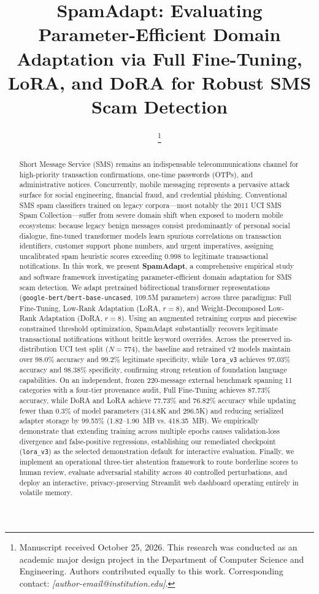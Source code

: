 \documentclass[conference]{IEEEtran}
\title{SpamAdapt: Evaluating Parameter-Efficient Domain Adaptation via Full Fine-Tuning, LoRA, and DoRA for Robust SMS Scam Detection}
\author{
    \IEEEauthorblockN{Akash Uchachariya\IEEEauthorrefmark{1}, Umang Mori\IEEEauthorrefmark{1}, and Keval Bamarotiya\IEEEauthorrefmark{1}}
    \IEEEauthorblockA{\IEEEauthorrefmark{1}\textit{Department of Computer Science and Engineering} \\
    \textit{[Institution / University Name]} \quad \textit{[City, State, Country]} \\
    \textit{Emails: [akash.uchachariya@institution.edu, umang.mori@institution.edu, keval.bamarotiya@institution.edu]}}
    \thanks{Manuscript received October 25, 2026. This research was conducted as an academic major design project in the Department of Computer Science and Engineering. Authors contributed equally to this work. Corresponding contact: \textit{[author-email@institution.edu]}.}
}
\begin{document}
\maketitle

\begin{abstract}
Short Message Service (SMS) remains an indispensable telecommunications channel for high-priority transaction confirmations, one-time passwords (OTPs), and administrative notices. Concurrently, mobile messaging represents a pervasive attack surface for social engineering, financial fraud, and credential phishing. Conventional SMS spam classifiers trained on legacy corpora---most notably the 2011 UCI SMS Spam Collection---suffer from severe domain shift when exposed to modern mobile ecosystems: because legacy benign messages consist predominantly of personal social dialogue, fine-tuned transformer models learn spurious correlations on transaction identifiers, customer support phone numbers, and urgent imperatives, assigning uncalibrated spam heuristic scores exceeding 0.998 to legitimate transactional notifications. In this work, we present \textbf{SpamAdapt}, a comprehensive empirical study and software framework investigating parameter-efficient domain adaptation for SMS scam detection. We adapt pretrained bidirectional transformer representations (\texttt{google-bert/bert-base-uncased}, 109.5M parameters) across three paradigms: Full Fine-Tuning, Low-Rank Adaptation (LoRA, $r=8$), and Weight-Decomposed Low-Rank Adaptation (DoRA, $r=8$). Using an augmented retraining corpus and piecewise constrained threshold optimization, SpamAdapt substantially recovers legitimate transactional notifications without brittle keyword overrides. Across the preserved in-distribution UCI test split ($N=774$), the baseline and retrained v2 models maintain over 98.0\% accuracy and 99.2\% legitimate specificity, while \texttt{lora\_v3} achieves 97.03\% accuracy and 98.38\% specificity, confirming strong retention of foundation language capabilities. On an independent, frozen 220-message external benchmark spanning 11 categories with a four-tier provenance audit, Full Fine-Tuning achieves 87.73\% accuracy, while DoRA and LoRA achieve 77.73\% and 76.82\% accuracy while updating fewer than 0.3\% of model parameters (314.8K and 296.5K) and reducing serialized adapter storage by 99.55\% (1.82--1.90~MB vs. 418.35~MB). We empirically demonstrate that extending training across multiple epochs causes validation-loss divergence and false-positive regressions, establishing our remediated checkpoint (\texttt{lora\_v3}) as the selected demonstration default for interactive evaluation. Finally, we implement an operational three-tier abstention framework to route borderline scores to human review, evaluate adversarial stability across 40 controlled perturbations, and deploy an interactive, privacy-preserving Streamlit web dashboard operating entirely in volatile memory.
\end{abstract}
\end{document}
